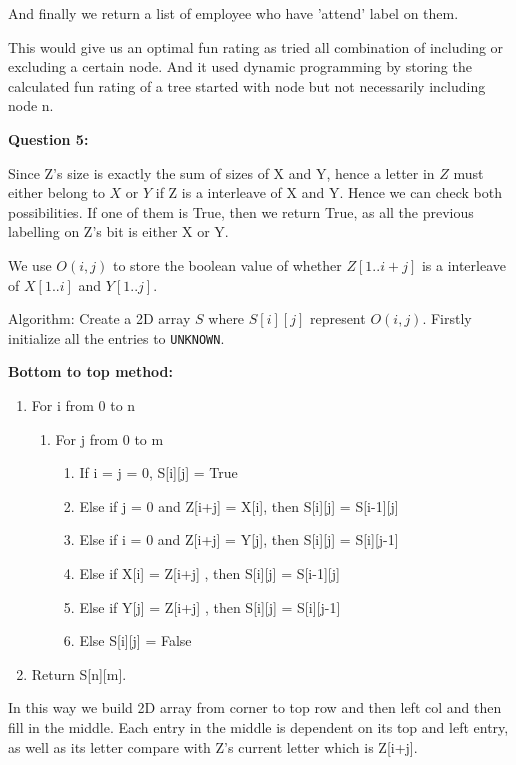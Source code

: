 \documentclass{article}
\begin{document}
And finally we return a list of employee who have 'attend' label on them.

This would give us an optimal fun rating as tried all combination of including or excluding a certain node. And it used dynamic programming by storing the calculated fun rating of a tree started with node but not necessarily including node n.\newline


\textbf{Question 5:}\newline

Since Z's size is exactly the sum of sizes of X and Y, hence a letter in $Z$ must either belong to $X$ or $Y$ if Z is a interleave of X and Y. Hence we can check both possibilities. If one of them is True, then we return True, as all the previous labelling on Z's bit is either X or Y.

We use $O(i, j)$ to store the boolean value of whether $Z[1 .. i+j]$ is a interleave of $X[1 .. i]$ and $Y[1 .. j]$.

Algorithm:\newline
Create a 2D array $S$ where $S[i][j]$ represent $O(i, j)$. Firstly initialize all the entries to \texttt{UNKNOWN}.\newline

\textbf{Bottom to top method:}
\begin{enumerate}
\item For i from 0 to n
  \begin{enumerate}
  \item For j from 0 to m
    \begin{enumerate}
    \item If i = j = 0, S[i][j] = True
    \item Else if j = 0 and Z[i+j] = X[i], then S[i][j] = S[i-1][j]
    \item Else if i = 0 and Z[i+j] = Y[j], then S[i][j] = S[i][j-1]
    \item Else if X[i] = Z[i+j] , then S[i][j] = S[i-1][j]
    \item Else if Y[j] = Z[i+j] , then S[i][j] = S[i][j-1]
    \item Else S[i][j] = False
    \end{enumerate}
  \end{enumerate}
\item Return S[n][m].
\end{enumerate}

In this way we build 2D array from corner to top row and then left col and then fill in the middle. Each entry in the middle is dependent on its top and left entry, as well as its letter compare with Z's current letter which is Z[i+j].\newline
\end{document}
